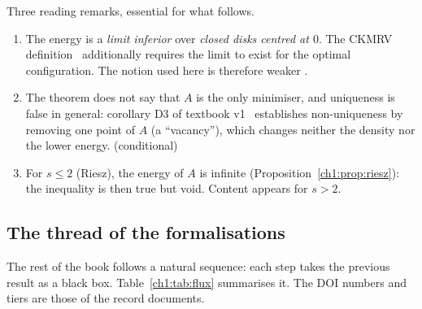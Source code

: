 Three reading remarks, essential for what follows.
\begin{enumerate}
\item The energy is a \emph{limit inferior} over \emph{closed disks centred at $0$}. The CKMRV definition~\cite{ckmrv} additionally requires the limit to exist for the
optimal configuration. The notion used here is therefore weaker \tierC{}.
\item The theorem does not say that $A$ is the only minimiser, and uniqueness is false in general: corollary D3 of textbook v1~\cite{v1} establishes
non-uniqueness by removing one point of $A$ (a ``vacancy''), which changes neither the density nor the lower energy. \tierA{} (conditional)
\item For $s\le2$ (Riesz), the energy of $A$ is infinite (Proposition~\ref{ch1:prop:riesz}): the inequality is then true but void. Content appears for $s>2$.
\end{enumerate}

\subsection{The thread of the formalisations}

The rest of the book follows a natural sequence: each step takes the previous result as a black box.
Table~\ref{ch1:tab:flux} summarises it. The DOI numbers and tiers are those of the record documents.

